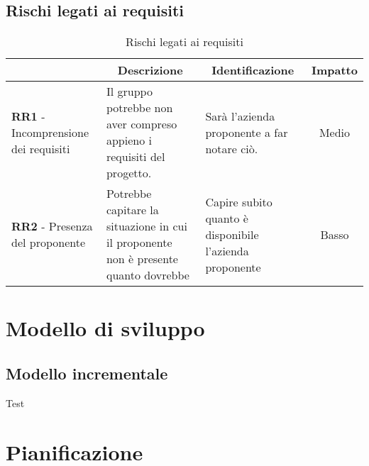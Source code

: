 \subsection{Rischi legati ai requisiti} \label{subsection:rischi_legati_ai_requisiti}
\begin{table}[H]
    \centering
    \renewcommand{\arraystretch}{1.8}
    \begin{tabular}{p{5.5cm}|p{5cm}|p{5cm}|c}
        \rowcolor[HTML]{1F85DE}
        \multicolumn{1}{c}{\color[HTML]{FFFFFF}\textbf{Codice}}
        & \multicolumn{1}{c}{\color[HTML]{FFFFFF}\textbf{Descrizione}}
        & \multicolumn{1}{c}{\color[HTML]{FFFFFF}\textbf{Identificazione}}
        & \color[HTML]{FFFFFF}\textbf{Impatto}\\
        \hline
        \textbf{RR1} - Incomprensione dei requisiti & Il gruppo potrebbe non aver compreso appieno i requisiti del progetto. & Sarà l'azienda proponente a far notare ciò. & Medio \\
        \textbf{RR2} - Presenza del proponente & Potrebbe capitare la situazione in cui il proponente non è presente quanto dovrebbe & Capire subito quanto è disponibile l'azienda proponente & Basso
    \end{tabular}
   \caption{Rischi legati ai requisiti}
\end{table}

\section{Modello di sviluppo}
\subsection{Modello incrementale} %
Test

\section{Pianificazione}
